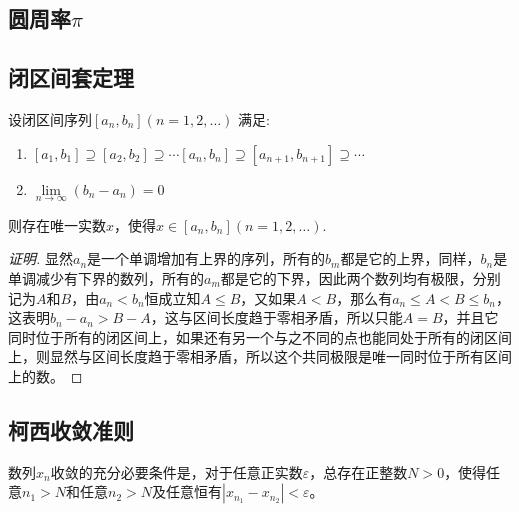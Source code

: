 \subsection{圆周率$\pi$}
\label{sec:pi}



\subsection{闭区间套定理}
\label{sec:theorem-of-closed-interval-sequence}

\begin{theorem}[闭区间套定理]
  \label{closed-interval-sequence-theorem}
  设闭区间序列$[a_n,b_n](n=1,2,\ldots)$ 满足:
  \begin{enumerate}
  \item $[a_1,b_1] \supseteq [a_2,b_2] \supseteq \cdots [a_n,b_n] \supseteq [a_{n+1},b_{n+1}] \supseteq \cdots$
  \item $\lim\limits_{n \to \infty} (b_n-a_n) = 0$
  \end{enumerate}
    则存在唯一实数$x$，使得$x \in [a_n,b_n](n=1,2,\ldots)$.
\end{theorem}

\begin{proof}[证明]
  显然$a_n$是一个单调增加有上界的序列，所有的$b_m$都是它的上界，同样，$b_n$是单调减少有下界的数列，所有的$a_m$都是它的下界，因此两个数列均有极限，分别记为$A$和$B$，由$a_n < b_n$恒成立知$A \leqslant B$，又如果$A<B$，那么有$a_n\leqslant A < B \leqslant b_n$，这表明$b_n-a_n>B-A$，这与区间长度趋于零相矛盾，所以只能$A=B$，并且它同时位于所有的闭区间上，如果还有另一个与之不同的点也能同处于所有的闭区间上，则显然与区间长度趋于零相矛盾，所以这个共同极限是唯一同时位于所有区间上的数。
\end{proof}

\subsection{柯西收敛准则}
\label{sec:cauchy-convergence-rule}

\begin{theorem}[柯西收敛准则]
  数列$x_n$收敛的充分必要条件是，对于任意正实数$\varepsilon$，总存在正整数$N>0$，使得任意$n_1>N$和任意$n_2>N$及任意恒有$|x_{n_1}-x_{n_2}| < \varepsilon$。
\end{theorem}

